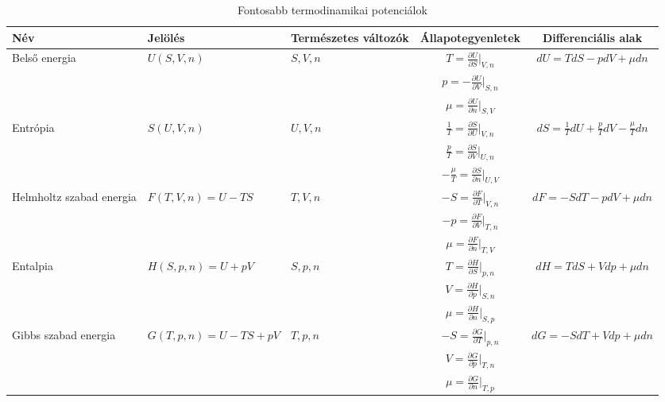\documentclass[a4paper,12pt]{article}
\begin{document}
\begin{table}[H]
    \centering
    \begin{tabular}{|p{2cm}|p{4cm}|p{2cm}|c|c|}
        \hline
        Név & Jelölés & Természetes változók & Állapotegyenletek & Differenciális alak \\
        \hline
        Belső energia & $U(S, V, n)$ & $S, V, n$ & $T = \frac{\partial U}{\partial S}\big|_{V,n}$ & $dU = T dS - p dV + \mu dn$ \\
         &  &  & $p = - \frac{\partial U}{\partial V}\big|_{S,n}$ &  \\
         &  &  & $\mu = \frac{\partial U}{\partial n}\big|_{S,V}$ &  \\
        \hline
        Entrópia & $S(U, V, n)$ & $U, V, n$ & $\frac{1}{T} = \frac{\partial S}{\partial U}\big|_{V,n}$ & $dS = \frac{1}{T} dU + \frac{p}{T} dV - \frac{\mu}{T} dn$ \\
         &  &  & $\frac{p}{T} = \frac{\partial S}{\partial V}\big|_{U,n}$ &  \\
         &  &  & $- \frac{\mu}{T} = \frac{\partial S}{\partial n}\big|_{U,V}$ &  \\
        \hline
        Helmholtz szabad energia & $F(T, V, n) = U - TS$ & $T, V, n$ & $- S = \frac{\partial F}{\partial T}\big|_{V,n}$ & $dF = - S dT - p dV + \mu dn$ \\
         &  &  & $- p = \frac{\partial F}{\partial V}\big|_{T,n}$ &  \\
         &  &  & $\mu = \frac{\partial F}{\partial n}\big|_{T,V}$ &  \\
        \hline
        Entalpia & $H(S, p, n) = U + pV$ & $S, p, n$ & $T = \frac{\partial H}{\partial S}\big|_{p,n}$ & $dH = T dS + V dp + \mu dn$ \\
         &  &  & $V = \frac{\partial H}{\partial p}\big|_{S,n}$ &  \\
         &  &  & $\mu = \frac{\partial H}{\partial n}\big|_{S,p}$ &  \\
        \hline
        Gibbs szabad energia & $G(T, p, n) = U - TS + pV$ & $T, p, n$ & $- S = \frac{\partial G}{\partial T}\big|_{p,n}$ & $dG = - S dT + V dp + \mu dn$ \\
         &  &  & $V = \frac{\partial G}{\partial p}\big|_{T,n}$ &  \\
         &  &  & $\mu = \frac{\partial G}{\partial n}\big|_{T,p}$ &  \\
        \hline
    \end{tabular}
    \caption{Fontosabb termodinamikai potenciálok}
\end{table}
\end{document}
